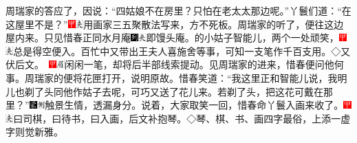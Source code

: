 周瑞家的答应了，因说：``四姑娘不在房里？只怕在老太太那边呢。''丫鬟们道：``在这屋里不是？''{\includegraphics[width=3mm]{../Images/00002}\includegraphics[width=3mm]{../Images/00012}\footnotesize \kaishu 用画家三五聚散法写来，方不死板。}周瑞家的听了，便往这边屋内来。只见惜春正同水月庵{\includegraphics[width=3mm]{../Images/00007}\includegraphics[width=3mm]{../Images/00012}\footnotesize \kaishu 即馒头庵。}的小姑子智能儿，两个一处顽笑，{\includegraphics[width=3mm]{../Images/00002}\includegraphics[width=3mm]{../Images/00012}\footnotesize \kaishu 总是得空便入。百忙中又带出王夫人喜施舍等事，可知一支笔作千百支用。◇又伏后文。　\includegraphics[width=3mm]{../Images/00002}\includegraphics[width=3mm]{../Images/00010}\footnotesize \kaishu 闲闲一笔，却将后半部线索提动。}见周瑞家的进来，惜春便问他何事。周瑞家的便将花匣打开，说明原故。惜春笑道：``我这里正和智能儿说，我明儿也剃了头同他作姑子去呢，可巧又送了花儿来。若剃了头，把这花可戴在那里？''{\includegraphics[width=3mm]{../Images/00006}\includegraphics[width=3mm]{../Images/00011}\footnotesize \kaishu 触景生情，透漏身分。}说着，大家取笑一回，惜春命丫鬟入画来收了。{\includegraphics[width=3mm]{../Images/00002}\includegraphics[width=3mm]{../Images/00012}\footnotesize \kaishu 曰司棋，曰待书，曰入画，后文补抱琴。◇琴、棋、书、画四字最俗，上添一虚字则觉新雅。}

